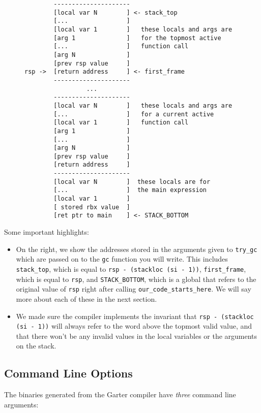 \documentclass[10pt, oneside]{article}
\begin{document}
\begin{figure}
\begin{verbatim}
        ---------------------
        [local var N        ] <- stack_top
        [...                ]
        [local var 1        ]   these locals and args are
        [arg 1              ]   for the topmost active
        [...                ]   function call
        [arg N              ]
        [prev rsp value     ]
rsp ->  [return address     ] <- first_frame
        ---------------------
                 ...            
        ---------------------
        [local var N        ]   these locals and args are
        [...                ]   for a current active
        [local var 1        ]   function call
        [arg 1              ]
        [...                ]
        [arg N              ]
        [prev rsp value     ]
        [return address     ]
        ---------------------
        [local var N        ]  these locals are for
        [...                ]  the main expression
        [local var 1        ]
        [ stored rbx value  ]
        [ret ptr to main    ] <- STACK_BOTTOM
\end{verbatim}
\end{figure}

Some important highlights:

\begin{itemize}
\item On the right, we show the addresses stored in the arguments given to
{\tt try\_gc} which are passed on to the {\tt gc} function you will write.
This includes {\tt stack\_top}, which is equal to {\tt rsp - (stackloc (si - 1))},
{\tt first\_frame}, which is equal to {\tt rsp}, and {\tt STACK\_BOTTOM},
which is a global that refers to the original value of {\tt rsp} right after
calling {\tt our\_code\_starts\_here}. We will say more about each of these
in the next section.
\item We made sure the compiler implements the invariant that {\tt rsp -
(stackloc (si - 1))} will always refer to the word above the topmost valid value,
and that there won't be any invalid values in the local variables or the
arguments on the stack.
\end{itemize}

\subsection*{Command Line Options}

The binaries generated from the Garter compiler have {\it three} command line
arguments:
\end{document}
